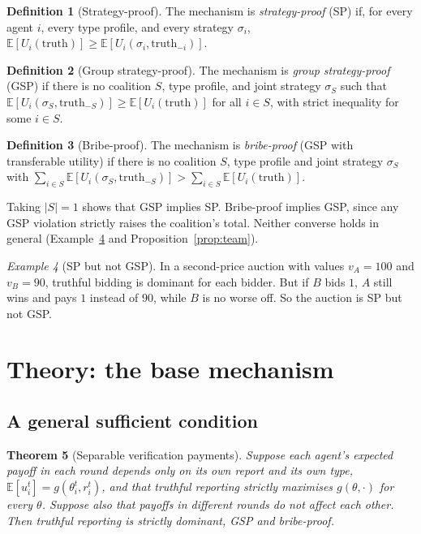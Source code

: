 \documentclass[11pt]{article}
\newtheorem{theorem}{Theorem}
\theoremstyle{definition}
\newtheorem{definition}[theorem]{Definition}
\theoremstyle{remark}
\newtheorem{example}[theorem]{Example}
\newcommand{\E}{\mathbb{E}}
\newcommand{\1}{\mathbf{1}}
\begin{document}
\begin{definition}[Strategy-proof]
The mechanism is \emph{strategy-proof} (SP) if, for every agent $i$, every type profile,
and every strategy $\sigma_i$,
$\E[U_i(\text{truth})]\ge \E[U_i(\sigma_i,\text{truth}_{-i})]$.
\end{definition}

\begin{definition}[Group strategy-proof]
The mechanism is \emph{group strategy-proof} (GSP) if there is no coalition $S$, type
profile, and joint strategy $\sigma_S$ such that
$\E[U_i(\sigma_S,\text{truth}_{-S})]\ge \E[U_i(\text{truth})]$ for all $i\in S$, with
strict inequality for some $i\in S$.
\end{definition}

\begin{definition}[Bribe-proof]
The mechanism is \emph{bribe-proof} (GSP with transferable utility) if there is no
coalition $S$, type profile and joint strategy $\sigma_S$ with
$\sum_{i\in S}\E[U_i(\sigma_S,\text{truth}_{-S})] > \sum_{i\in S}\E[U_i(\text{truth})]$.
\end{definition}

Taking $|S|=1$ shows that GSP implies SP. Bribe-proof implies GSP, since any GSP
violation strictly raises the coalition's total. Neither converse holds in general
(Example~\ref{ex:vickrey} and Proposition~\ref{prop:team}).

\begin{example}[SP but not GSP]\label{ex:vickrey}
In a second-price auction with values $v_A=100$ and $v_B=90$, truthful bidding is
dominant for each bidder. But if $B$ bids $1$, $A$ still wins and pays $1$ instead of
$90$, while $B$ is no worse off. So the auction is SP but not GSP.
\end{example}

\section{Theory: the base mechanism}
\label{sec:theory}

\subsection{A general sufficient condition}

\begin{theorem}[Separable verification payments]\label{thm:separable}
Suppose each agent's expected payoff in each round depends only on its own report and its
own type, $\E[u_i^t]=g(\theta_i^t,r_i^t)$, and that truthful reporting strictly maximises
$g(\theta,\cdot)$ for every $\theta$. Suppose also that payoffs in different rounds do not
affect each other. Then truthful reporting is strictly dominant, GSP and bribe-proof.
\end{theorem}
\end{document}
